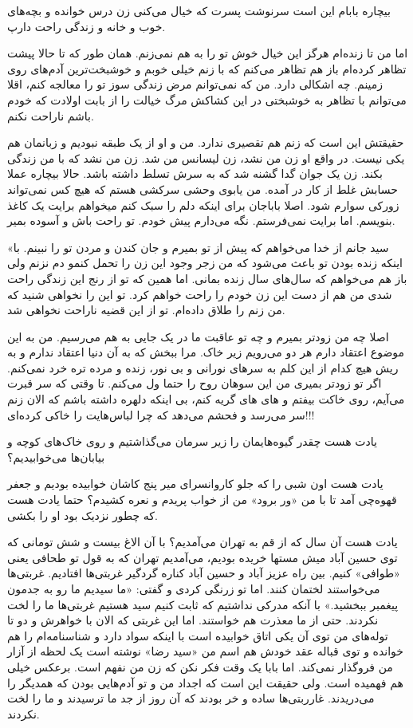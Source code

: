 \documentclass[12pt,a4paper]{book}
\begin{document}
بیچاره بابام این است سرنوشت پسرت که خیال می‌کنی زن درس خوانده و بچه‌های خوب و خانه و زندگی راحت دارپ.

اما من تا زنده‌ام هرگز این خیال خوش تو را به هم نمی‌زنم. همان طور که تا حالا پیشت تظاهر کرده‌ام باز هم تظاهر می‌کنم که با زنم خیلی خوبم و خوشبخت‌ترین آدم‌های روی زمینم. چه اشکالی دارد. من که نمی‌توانم مرض زندگی سوز تو را معالجه کنم، اقلا می‌توانم با تظاهر به خوشبختی در این کشاکش مرگ خیالت را از بابت اولادت که خودم باشم ناراحت نکنم.

حقیقتش این است که زنم هم تقصیری ندارد. من و او از یک طبقه نبودیم و زبانمان هم یکی نیست. در واقع او زن من نشد، زن لیسانس من شد. زن من نشد که با من زندگی بکند. زن یک جوان گدا گشنه شد که به سرش تسلط داشته باشد. حالا بیچاره عملا حسابش غلط از کار در آمده. من یابوی وحشی سرکشی هستم که هیچ کس نمی‌تواند زورکی سوارم شود. اصلا باباجان برای اینکه دلم را سبک کنم میخواهم برایت یک کاغذ بنویسم. اما برایت نمی‌فرستم. نگه می‌دارم پیش خودم. تو راحت باش و آسوده بمیر.

«سید جانم از خدا می‌خواهم که پیش از تو بمیرم و جان کندن و مردن تو را نبینم. با اینکه زنده بودن تو باعث می‌شود که من زجر وجود این زن را تحمل کنمو دم نزنم ولی باز هم می‌خواهم که سال‌های سال زنده بمانی. اما همین که تو از رنج این زندگی راحت شدی من هم از دست این زن خودم را راحت خواهم کرد. تو این را نخواهی شنید که من زنم را طلاق داده‌ام. تو از این قضیه ناراحت نخواهی شد.

اصلا چه من زودتر بمیرم و چه تو عاقبت ما در یک جایی به هم می‌رسیم. من به این موضوع اعتقاد دارم هر دو می‌رویم زیر خاک. مرا ببخش که به آن دنیا اعتقاد ندارم و به ریش هیچ کدام از این کلم به سرهای نورانی و بی نور، زنده و مرده تره خرد نمی‌کنم. اگر تو زودتر بمیری من این سوهان روح را حتما ول می‌کنم. تا وقتی که سر قبرت می‌آیم، روی خاکت بیفتم و های های گریه کنم، بی اینکه دلهره داشته باشم که الان زنم سر می‌رسد و فحشم می‌دهد که چرا لباس‌هایت را خاکی کرده‌ای!!!

یادت هست چقدر گیوه‌هایمان را زیر سرمان می‌گذاشتیم و روی خاک‌های کوچه و بیابان‌ها می‌خوابیدیم؟

یادت هست اون شبی را که جلو کاروانسرای میر پنج کاشان خوابیده بودیم و جعفر قهوه‌چی آمد تا با من «ور برود» من از خواب پریدم و نعره کشیدم؟ حتما یادت هست که چطور نزدیک بود او را بکشی.

یادت هست آن سال که از قم به تهران می‌آمدیم؟ با آن الاغ بیست و شش تومانی که توی حسین آباد میش مستها خریده بودیم، می‌آمدیم تهران که به قول تو طحافی یعنی «طوافی» کنیم. بین راه عزیز آباد و حسین آباد کناره گردگیر غربتی‌ها افتادیم. غربتی‌ها می‌خواستند لختمان کنند. اما تو زرنگی کردی و گفتی: «ما سیدیم ما رو به جدمون پیغمبر ببخشید.» با آنکه مدرکی نداشتیم که ثابت کنیم سید هستیم غربتی‌ها ما را لخت نکردند. حتی از ما معذرت هم خواستند. اما این غربتی‌ که الان با خواهرش و دو تا توله‌های من توی آن یکی اتاق خوابیده است با اینکه سواد دارد و شناسنامه‌ام را هم خوانده و توی قباله عقد خودش هم اسم من «سید رضا» نوشته است یک لحظه از آزار من فروگذار نمی‌کند. اما بابا یک وقت فکر نکن که زن من نفهم است. برعکس خیلی هم فهمیده است. ولی حقیقت این است که اجداد من و تو آدم‌هایی بودن که همدیگر را می‌دریدند. غارربتی‌ها ساده و خر بودند که آن روز از جد ما ترسیدند و ما را لخت نکردند. 
\end{document}
